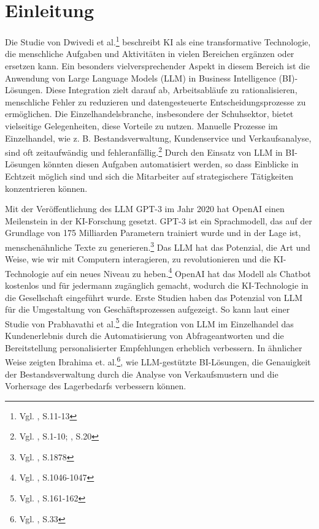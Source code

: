 

\section{Einleitung} 
\label{sec:einleitung}

Die Studie von Dwivedi et al.\footnote{Vgl. \cite{DwivediHughes2021}, S.11-13} beschreibt KI als eine transformative Technologie, die menschliche Aufgaben und Aktivitäten in vielen Bereichen ergänzen oder ersetzen kann. Ein besonders vielversprechender Aspekt in diesem Bereich ist die Anwendung von Large Language Models (LLM) in Business Intelligence (BI)-Lösungen. Diese Integration zielt darauf ab, Arbeitsabläufe zu rationalisieren, menschliche Fehler zu reduzieren und datengesteuerte Entscheidungsprozesse zu ermöglichen. 
Die Einzelhandelsbranche, insbesondere der Schuhsektor, bietet vielseitige Gelegenheiten, diese Vorteile zu nutzen. Manuelle Prozesse im Einzelhandel, wie z. B. Bestandsverwaltung, Kundenservice und Verkaufsanalyse, sind oft zeitaufwändig und fehleranfällig.\footnote{Vgl. \cite{Perez2018}, S.1-10; \cite{Lee2018}, S.20} Durch den Einsatz von LLM in BI-Lösungen könnten diesen Aufgaben automatisiert werden, so dass Einblicke in Echtzeit möglich sind und sich die Mitarbeiter auf strategischere Tätigkeiten konzentrieren können.


Mit der Veröffentlichung des LLM GPT-3 im Jahr 2020 hat OpenAI einen Meilenstein in der KI-Forschung gesetzt. GPT-3 ist ein Sprachmodell, das auf der Grundlage von 175 Milliarden Parametern trainiert wurde und in der Lage ist, menschenähnliche Texte zu generieren.\footnote{Vgl. \cite{Brown2020}, S.1878} Das LLM hat das Potenzial, die Art und Weise, wie wir mit Computern interagieren, zu revolutionieren und die KI-Technologie auf ein neues Niveau zu heben.\footnote{Vgl. \cite{Lu2021}, S.1046-1047} OpenAI hat das Modell als Chatbot kostenlos und für jedermann zugänglich gemacht, wodurch die KI-Technologie in die Gesellschaft eingeführt wurde. Erste Studien haben das Potenzial von LLM für die Umgestaltung von Geschäftsprozessen aufgezeigt. So kann laut einer Studie von Prabhavathi et al.\footnote{Vgl. \cite{Prabhavathi2019}, S.161-162} die Integration von LLM im Einzelhandel das Kundenerlebnis durch die Automatisierung von Abfrageantworten und die Bereitstellung personalisierter Empfehlungen erheblich verbessern. In ähnlicher Weise zeigten Ibrahima et. al.\footnote{Vgl. \cite{Ibrahima2021}, S.33}, wie LLM-gestützte BI-Lösungen, die Genauigkeit der Bestandsverwaltung durch die Analyse von Verkaufsmustern und die Vorhersage des Lagerbedarfs verbessern können.

